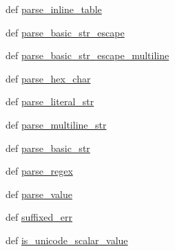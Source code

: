 \begin{DoxyCompactItemize}
def \hyperlink{namespacepip_1_1__vendor_1_1tomli_1_1__parser_ad8d2869baf60b7ba9f5cc27ffb63dfbb}{parse\+\_\+inline\+\_\+table}
\item 
def \hyperlink{namespacepip_1_1__vendor_1_1tomli_1_1__parser_a739821d9fbf7598b3e1dc81a67eb82ee}{parse\+\_\+basic\+\_\+str\+\_\+escape}
\item 
def \hyperlink{namespacepip_1_1__vendor_1_1tomli_1_1__parser_a64c333c28662889e7ae9d8e055c24b44}{parse\+\_\+basic\+\_\+str\+\_\+escape\+\_\+multiline}
\item 
def \hyperlink{namespacepip_1_1__vendor_1_1tomli_1_1__parser_a463b4c29e92074bf2f31b4c773277cf5}{parse\+\_\+hex\+\_\+char}
\item 
def \hyperlink{namespacepip_1_1__vendor_1_1tomli_1_1__parser_aa14c75fb7425c4350512ecac296d5dca}{parse\+\_\+literal\+\_\+str}
\item 
def \hyperlink{namespacepip_1_1__vendor_1_1tomli_1_1__parser_ac23d5a017c20d7d8a1d967e315601993}{parse\+\_\+multiline\+\_\+str}
\item 
def \hyperlink{namespacepip_1_1__vendor_1_1tomli_1_1__parser_adb95c6f6d455fd20fe3e9a2bf1a9ac15}{parse\+\_\+basic\+\_\+str}
\item 
def \hyperlink{namespacepip_1_1__vendor_1_1tomli_1_1__parser_a098b55e210ee9b02637e03312dd6c9b4}{parse\+\_\+regex}
\item 
def \hyperlink{namespacepip_1_1__vendor_1_1tomli_1_1__parser_a380811bdc3eadadeaaa73eaaed799e8c}{parse\+\_\+value}
\item 
def \hyperlink{namespacepip_1_1__vendor_1_1tomli_1_1__parser_a53c68c389fac71556d7cf2d05230f2ba}{suffixed\+\_\+err}
\item 
def \hyperlink{namespacepip_1_1__vendor_1_1tomli_1_1__parser_ae02e4829457a606f3766e57e83324fc0}{is\+\_\+unicode\+\_\+scalar\+\_\+value}
\end{DoxyCompactItemize}
